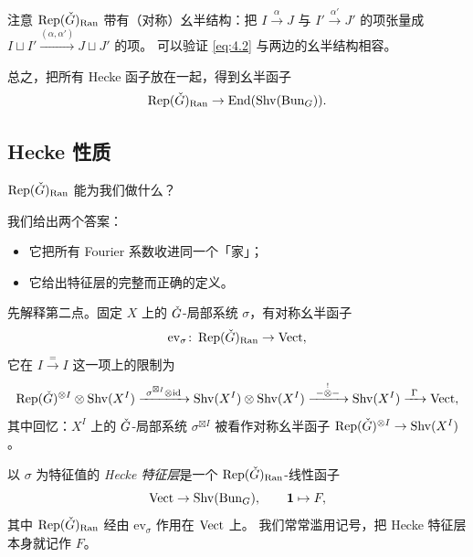 注意 \(\operatorname{Rep}(\check{G})_{\mathrm{Ran}}\) 带有（对称）幺半结构：把 \(I\xrightarrow{\alpha}J\) 与
\(I'\xrightarrow{\alpha'}J'\) 的项张量成 \(I\sqcup I'\xrightarrow{(\alpha,\alpha')}J\sqcup J'\) 的项。
可以验证 \eqref{eq:4.2} 与两边的幺半结构相容。

总之，把所有 Hecke 函子放在一起，得到幺半函子
\[
\operatorname{Rep}(\check{G})_{\mathrm{Ran}}\to\operatorname{End}(\operatorname{Shv}(\operatorname{Bun}_G)).
\]

\subsection{Hecke 性质}

\begin{question}\label{ques:ran}
\(\operatorname{Rep}(\check{G})_{\mathrm{Ran}}\) 能为我们做什么？
\end{question}

我们给出两个答案：

\begin{itemize}
\item 它把所有 Fourier 系数收进同一个「家」；
\item 它给出特征层的完整而正确的定义。
\end{itemize}

先解释第二点。固定 \(X\) 上的 \(\check{G}\)-局部系统 \(\sigma\)，有对称幺半函子
\[
\mathrm{ev}_\sigma\colon\operatorname{Rep}(\check{G})_{\mathrm{Ran}}\to\mathrm{Vect},
\]
它在 \(I\xrightarrow{=}I\) 这一项上的限制为
\[
\operatorname{Rep}(\check{G})^{\otimes I}\otimes\operatorname{Shv}(X^I)
\xrightarrow{\ \sigma^{\boxtimes I}\otimes\mathrm{id}\ }
\operatorname{Shv}(X^I)\otimes\operatorname{Shv}(X^I)
\xrightarrow{\ -\overset{!}{\otimes}-\ }
\operatorname{Shv}(X^I)\xrightarrow{\ \Gamma\ }\mathrm{Vect},
\]
其中回忆：\(X^I\) 上的 \(\check{G}\)-局部系统 \(\sigma^{\boxtimes I}\) 被看作对称幺半函子
\(\operatorname{Rep}(\check{G})^{\otimes I}\to\operatorname{Shv}(X^I)\)。

\begin{definition}\label{def:eigensheaf}
以 \(\sigma\) 为特征值的 \emph{Hecke 特征层}是一个 \(\operatorname{Rep}(\check{G})_{\mathrm{Ran}}\)-线性函子
\[
\mathrm{Vect}\to\operatorname{Shv}(\operatorname{Bun}_G),\qquad \mathbf{1}\mapsto F,
\]
其中 \(\operatorname{Rep}(\check{G})_{\mathrm{Ran}}\) 经由 \(\mathrm{ev}_\sigma\) 作用在 \(\mathrm{Vect}\) 上。
我们常常滥用记号，把 Hecke 特征层本身就记作 \(F\)。
\end{definition}

